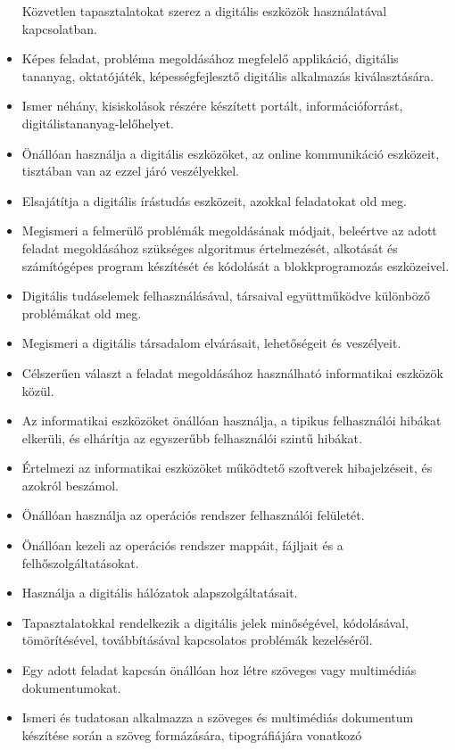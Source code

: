 \begin{itemize}
  Közvetlen tapasztalatokat szerez a digitális eszközök használatával
  kapcsolatban.
\item
  Képes feladat, probléma megoldásához megfelelő applikáció, digitális
  tananyag, oktatójáték, képességfejlesztő digitális alkalmazás
  kiválasztására.
\item
  Ismer néhány, kisiskolások részére készített portált,
  információforrást, digitálistananyag-lelőhelyet.
\item
  Önállóan használja a digitális eszközöket, az online kommunikáció
  eszközeit, tisztában van az ezzel járó veszélyekkel.
\item
  Elsajátítja a digitális írástudás eszközeit, azokkal feladatokat old
  meg.
\item
  Megismeri a felmerülő problémák megoldásának módjait, beleértve az
  adott feladat megoldásához szükséges algoritmus értelmezését,
  alkotását és számítógépes program készítését és kódolását a
  blokkprogramozás eszközeivel.
\item
  Digitális tudáselemek felhasználásával, társaival együttműködve
  különböző problémákat old meg.
\item
  Megismeri a digitális társadalom elvárásait, lehetőségeit és
  veszélyeit.
\item
  Célszerűen választ a feladat megoldásához használható informatikai
  eszközök közül.
\item
  Az informatikai eszközöket önállóan használja, a tipikus felhasználói
  hibákat elkerüli, és elhárítja az egyszerűbb felhasználói szintű
  hibákat.
\item
  Értelmezi az informatikai eszközöket működtető szoftverek
  hibajelzéseit, és azokról beszámol.
\item
  Önállóan használja az operációs rendszer felhasználói felületét.
\item
  Önállóan kezeli az operációs rendszer mappáit, fájljait és a
  felhőszolgáltatásokat.
\item
  Használja a digitális hálózatok alapszolgáltatásait.
\item
  Tapasztalatokkal rendelkezik a digitális jelek minőségével,
  kódolásával, tömörítésével, továbbításával kapcsolatos problémák
  kezeléséről.
\item
  Egy adott feladat kapcsán önállóan hoz létre szöveges vagy multimédiás
  dokumentumokat.
\item
  Ismeri és tudatosan alkalmazza a szöveges és multimédiás dokumentum
  készítése során a szöveg formázására, tipográfiájára vonatkozó

\end{itemize}
